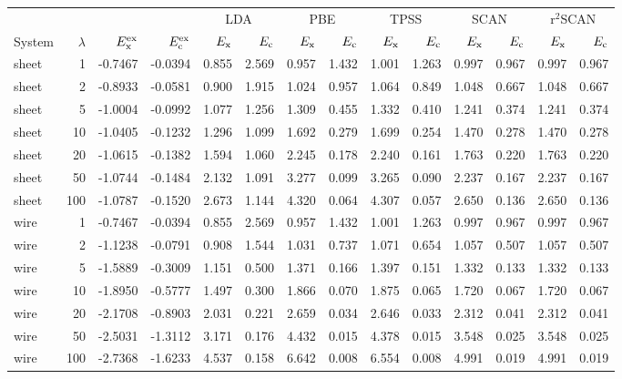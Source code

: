 \begin{tabular}{lrrrrrrrrrrrrr}
\toprule
& & & & \multicolumn{2}{c}{LDA} & \multicolumn{2}{c}{PBE} & \multicolumn{2}{c}{TPSS} & \multicolumn{2}{c}{SCAN} & \multicolumn{2}{c}{r$^2$SCAN} \\
System & $\lambda$ & $E_{\rm x}^{\rm ex}$ & $E_{\rm c}^{\rm ex}$ & $E_{\rm x}$ & $E_{\rm c}$ & $E_{\rm x}$ & $E_{\rm c}$ & $E_{\rm x}$ & $E_{\rm c}$ & $E_{\rm x}$ & $E_{\rm c}$ & $E_{\rm x}$ & $E_{\rm c}$ \\
\midrule
sheet & 1 & -0.7467 & -0.0394 & 0.855 & 2.569 & 0.957 & 1.432 & 1.001 & 1.263 & 0.997 & 0.967 & 0.997 & 0.967 \\
sheet & 2 & -0.8933 & -0.0581 & 0.900 & 1.915 & 1.024 & 0.957 & 1.064 & 0.849 & 1.048 & 0.667 & 1.048 & 0.667 \\
sheet & 5 & -1.0004 & -0.0992 & 1.077 & 1.256 & 1.309 & 0.455 & 1.332 & 0.410 & 1.241 & 0.374 & 1.241 & 0.374 \\
sheet & 10 & -1.0405 & -0.1232 & 1.296 & 1.099 & 1.692 & 0.279 & 1.699 & 0.254 & 1.470 & 0.278 & 1.470 & 0.278 \\
sheet & 20 & -1.0615 & -0.1382 & 1.594 & 1.060 & 2.245 & 0.178 & 2.240 & 0.161 & 1.763 & 0.220 & 1.763 & 0.220 \\
sheet & 50 & -1.0744 & -0.1484 & 2.132 & 1.091 & 3.277 & 0.099 & 3.265 & 0.090 & 2.237 & 0.167 & 2.237 & 0.167 \\
sheet & 100 & -1.0787 & -0.1520 & 2.673 & 1.144 & 4.320 & 0.064 & 4.307 & 0.057 & 2.650 & 0.136 & 2.650 & 0.136 \\
\midrule
wire & 1 & -0.7467 & -0.0394 & 0.855 & 2.569 & 0.957 & 1.432 & 1.001 & 1.263 & 0.997 & 0.967 & 0.997 & 0.967 \\
wire & 2 & -1.1238 & -0.0791 & 0.908 & 1.544 & 1.031 & 0.737 & 1.071 & 0.654 & 1.057 & 0.507 & 1.057 & 0.507 \\
wire & 5 & -1.5889 & -0.3009 & 1.151 & 0.500 & 1.371 & 0.166 & 1.397 & 0.151 & 1.332 & 0.133 & 1.332 & 0.133 \\
wire & 10 & -1.8950 & -0.5777 & 1.497 & 0.300 & 1.866 & 0.070 & 1.875 & 0.065 & 1.720 & 0.067 & 1.720 & 0.067 \\
wire & 20 & -2.1708 & -0.8903 & 2.031 & 0.221 & 2.659 & 0.034 & 2.646 & 0.033 & 2.312 & 0.041 & 2.312 & 0.041 \\
wire & 50 & -2.5031 & -1.3112 & 3.171 & 0.176 & 4.432 & 0.015 & 4.378 & 0.015 & 3.548 & 0.025 & 3.548 & 0.025 \\
wire & 100 & -2.7368 & -1.6233 & 4.537 & 0.158 & 6.642 & 0.008 & 6.554 & 0.008 & 4.991 & 0.019 & 4.991 & 0.019 \\
\bottomrule
\end{tabular}
